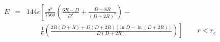 


\begin{eqnarray}
E &=& 144 \epsilon \left[ \frac{\sigma^{6}}{7560} 
  \left(\frac{6R-D}{D^{7}} + \frac{D+8R}{(D+2R)^{7}} \right) - 
  \frac{}{} \right. \nonumber \\
  &&\qquad \left. \frac{1}{6} \left(\frac{2R(D+R) + D(D+2R)
    \left[ \ln D - \ln (D+2R) \right]}{D(D+2R)} \right) \right] 
\qquad r < r_c \nonumber
\end{eqnarray}


